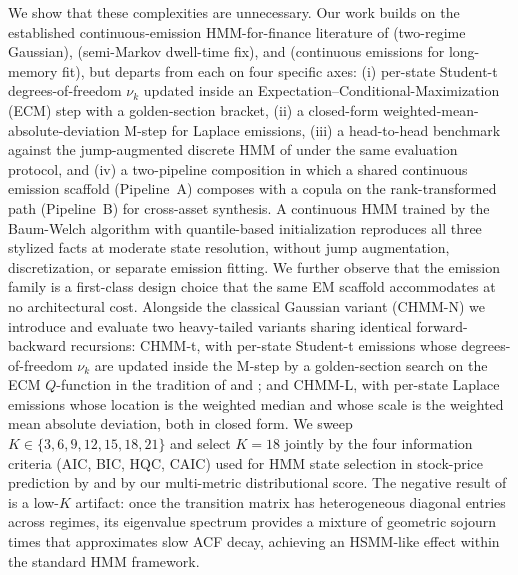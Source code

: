 We show that these complexities are unnecessary.
Our work builds on the established continuous-emission HMM-for-finance literature of \citet{hamilton1989new} (two-regime Gaussian), \citet{bulla2006stylized} (semi-Markov dwell-time fix), and \citet{nystrup2017long} (continuous emissions for long-memory fit), but departs from each on four specific axes: (i) per-state Student-t degrees-of-freedom $\nu_k$ updated inside an Expectation--Conditional-Maximization (ECM) step with a golden-section bracket, (ii) a closed-form weighted-mean-absolute-deviation M-step for Laplace emissions, (iii) a head-to-head benchmark against the jump-augmented discrete HMM of \citet{alswaidan2026hybrid} under the same evaluation protocol, and (iv) a two-pipeline composition in which a shared continuous emission scaffold (Pipeline~A) composes with a copula on the rank-transformed path (Pipeline~B) for cross-asset synthesis.
A continuous HMM trained by the Baum-Welch algorithm \cite{baum1970maximization, rabiner1986introduction} with quantile-based initialization reproduces all three stylized facts at moderate state resolution, without jump augmentation, discretization, or separate emission fitting.
We further observe that the emission family is a first-class design choice that the same EM scaffold accommodates at no architectural cost.
Alongside the classical Gaussian variant (CHMM-N) we introduce and evaluate two heavy-tailed variants sharing identical forward-backward recursions: CHMM-t, with per-state Student-t emissions whose degrees-of-freedom $\nu_k$ are updated inside the M-step by a golden-section search on the ECM $Q$-function in the tradition of \citet{peel2000robust} and \citet{liu1995ml}; and CHMM-L, with per-state Laplace emissions whose location is the weighted median and whose scale is the weighted mean absolute deviation, both in closed form.
We sweep $K \in \{3, 6, 9, 12, 15, 18, 21\}$ and select $K = 18$ jointly by the four information criteria (AIC, BIC, HQC, CAIC) used for HMM state selection in stock-price prediction by \citet{nguyen2018hidden} and by our multi-metric distributional score.
The negative result of \citet{ryden1998stylized} is a low-$K$ artifact: once the transition matrix has heterogeneous diagonal entries across regimes, its eigenvalue spectrum provides a mixture of geometric sojourn times that approximates slow ACF decay, achieving an HSMM-like effect within the standard HMM framework.

